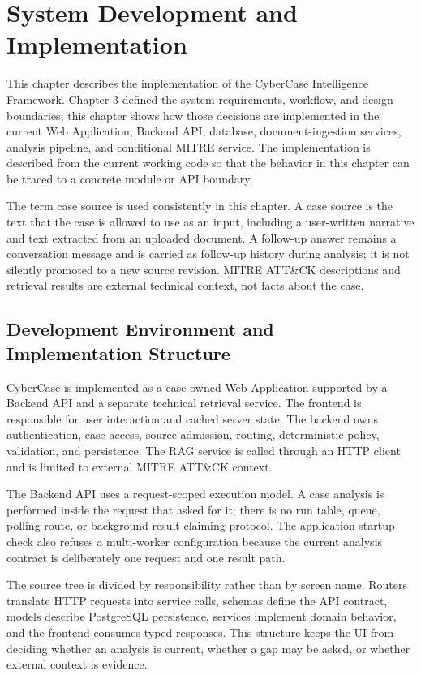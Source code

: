 \chapter{System Development and Implementation}

This chapter describes the implementation of the CyberCase Intelligence Framework. Chapter 3 defined the system requirements, workflow, and design boundaries; this chapter shows how those decisions are implemented in the current Web Application, Backend API, database, document-ingestion services, analysis pipeline, and conditional MITRE service. The implementation is described from the current working code so that the behavior in this chapter can be traced to a concrete module or API boundary.

The term case source is used consistently in this chapter. A case source is the text that the case is allowed to use as an input, including a user-written narrative and text extracted from an uploaded document. A follow-up answer remains a conversation message and is carried as follow-up history during analysis; it is not silently promoted to a new source revision. MITRE ATT\&CK descriptions and retrieval results are external technical context, not facts about the case.

\section{Development Environment and Implementation Structure}

CyberCase is implemented as a case-owned Web Application supported by a Backend API and a separate technical retrieval service. The frontend is responsible for user interaction and cached server state. The backend owns authentication, case access, source admission, routing, deterministic policy, validation, and persistence. The RAG service is called through an HTTP client and is limited to external MITRE ATT\&CK context.

The Backend API uses a request-scoped execution model. A case analysis is performed inside the request that asked for it; there is no run table, queue, polling route, or background result-claiming protocol. The application startup check also refuses a multi-worker configuration because the current analysis contract is deliberately one request and one result path.

The source tree is divided by responsibility rather than by screen name. Routers translate HTTP requests into service calls, schemas define the API contract, models describe PostgreSQL persistence, services implement domain behavior, and the frontend consumes typed responses. This structure keeps the UI from deciding whether an analysis is current, whether a gap may be asked, or whether external context is evidence.

